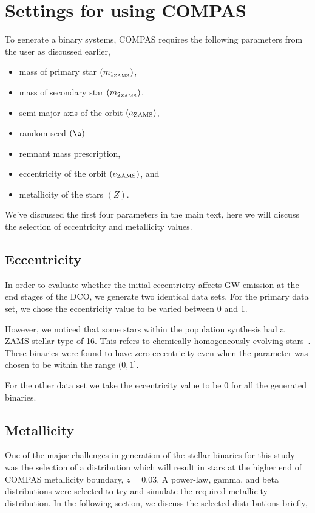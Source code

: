\section{Settings for using COMPAS}
\label{sec:appA}
To generate a binary systems, COMPAS requires the following parameters from the user as discussed earlier,
\begin{itemize}
    \item mass of primary star $(m_{1_{\text{ZAMS}}})$,
    \item mass of secondary star $(m_{2_{\text{ZAMS}}})$,
    \item semi-major axis of the orbit $(a_{\text{ZAMS}})$,
    \item random seed $(\o)$
    \item remnant mass prescription,
    \item eccentricity of the orbit $(e_\text{ZAMS})$, and
    \item metallicity of the stars $\left(Z\right)$.
\end{itemize}

We've discussed the first four parameters in the main text, here we will discuss the selection of eccentricity and metallicity values.

\subsection{Eccentricity}
\label{subsec:eccentricity}

In order to evaluate whether the initial eccentricity affects GW emission at the end stages of the DCO, we generate two identical data sets.
For the primary data set, we chose the eccentricity value to be varied between 0 and 1.

However, we noticed that some stars within the population synthesis had a ZAMS stellar type of 16.
This refers to chemically homogeneously evolving stars~\citep{Riley2021, Riley2022}. 
These binaries were found to have zero eccentricity even when the parameter was chosen to be within the range $(0, 1]$.

For the other data set we take the eccentricity value to be 0 for all the generated binaries.

\subsection{Metallicity}
\label{subsec:metallicity}

One of the major challenges in generation of the stellar binaries for this study was the selection of a distribution which will result in stars at the higher end of COMPAS metallicity boundary, $z = 0.03$.
A power-law, gamma, and beta distributions were selected to try and simulate the required metallicity distribution.
In the following section, we discuss the selected distributions briefly,

